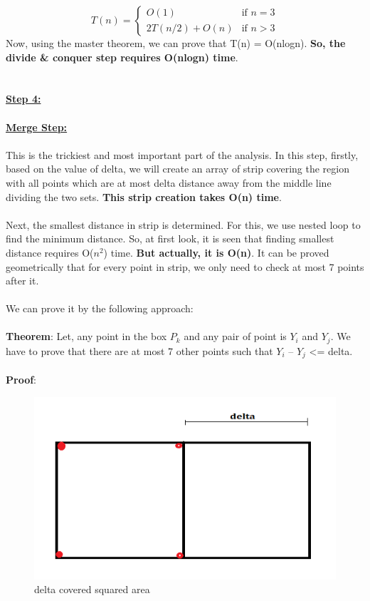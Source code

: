 \documentclass[a4paper]{article}
\begin{document}
\[
  T(n) =
  \begin{cases}
                                   O(1) & \text{if $n=3$} \\
  2 T(n/2) + O(n) & \text{if $n>3$}
  \end{cases}
\]
Now, using the master theorem, we can prove that T(n) = O(nlogn).
\textbf{So, the divide \& conquer step requires O(nlogn) time}.\\\\\\
\textbf{\underline{Step 4:}}\\\\
\textbf{\underline{Merge Step:}}\\\\
        This is the trickiest and most important part of the analysis. In this step, firstly, based on the value of delta, we will create an array of strip covering the region with all points which are at most delta distance away from the middle line dividing the two sets. \textbf{This strip creation takes O(n) time}.\\\\
        Next, the smallest distance in strip is determined. For this, we use nested loop to find the minimum distance. So, at first look, it is seen that finding smallest distance requires O(${n}^2$) time. \textbf{But actually, it is O(n)}. It can be proved geometrically that for every point in strip, we only need to check at most 7 points after it. \\\\
        We can prove it by the following approach: \\\\
\textbf{Theorem}:  Let, any point in the box $P_k$ and any pair of point is $Y_i$ and $Y_j$.  We have to prove that there are at most 7 other points such that $Y_i$ – $Y_j$ <= delta.\\\\
\textbf{Proof}:
\begin{figure}[H]
\center
\includegraphics{images/box.png}
\caption{delta covered squared area}
\end{figure}
\end{document}
